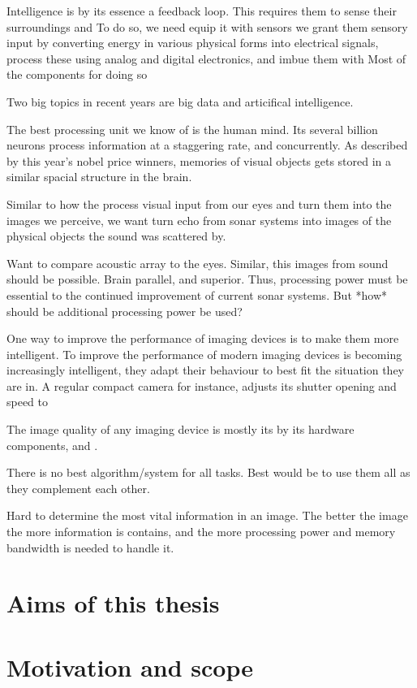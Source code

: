 Intelligence is by its essence a feedback loop. 
This requires them to sense their surroundings and To do so, we need equip it with sensors we grant them sensory input by converting energy in various physical forms into electrical signals, process these using analog and digital electronics, and imbue them with  Most of the components for doing so 

Two big topics in recent years are big data and articifical intelligence. 




The best processing unit we know of is the human mind. Its several billion neurons process information at a staggering rate, and concurrently. As described by this year's nobel price winners, memories of visual objects gets stored in a similar spacial structure in the brain.  

Similar to how the process visual input from our eyes and turn them into the images we perceive, we want turn echo from sonar systems into images of the physical objects the sound was scattered by. 

Want to compare acoustic array to the eyes. Similar, this images from sound should be possible. Brain parallel, and superior. Thus, processing power must be essential to the continued improvement of current sonar systems. But *how* should be additional processing power be used?

One way to improve the performance of imaging devices is to make them more intelligent. 
To improve the performance of modern imaging devices is becoming increasingly intelligent, they adapt their behaviour to best fit the situation they are in. A regular compact camera for instance, adjusts its shutter opening and speed to 

The image quality of any imaging device is mostly its by its hardware components, and .

There is no best algorithm/system for all tasks. Best would be to use them all as they complement each other. 

Hard to determine the most vital information in an image. The better the image the more information is contains, and the more processing power and memory bandwidth is needed to handle it.



\section{Aims of this thesis}

\section{Motivation and scope}

